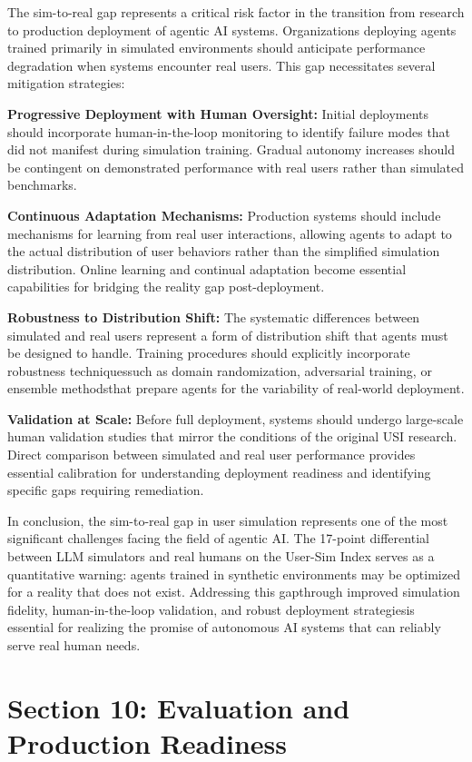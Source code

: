 The sim-to-real gap represents a critical risk factor in the transition from research to production deployment of agentic AI systems. Organizations deploying agents trained primarily in simulated environments should anticipate performance degradation when systems encounter real users. This gap necessitates several mitigation strategies:

\textbf{Progressive Deployment with Human Oversight:} Initial deployments should incorporate human-in-the-loop monitoring to identify failure modes that did not manifest during simulation training. Gradual autonomy increases should be contingent on demonstrated performance with real users rather than simulated benchmarks.

\textbf{Continuous Adaptation Mechanisms:} Production systems should include mechanisms for learning from real user interactions, allowing agents to adapt to the actual distribution of user behaviors rather than the simplified simulation distribution. Online learning and continual adaptation become essential capabilities for bridging the reality gap post-deployment.

\textbf{Robustness to Distribution Shift:} The systematic differences between simulated and real users represent a form of distribution shift that agents must be designed to handle. Training procedures should explicitly incorporate robustness techniquessuch as domain randomization, adversarial training, or ensemble methodsthat prepare agents for the variability of real-world deployment.

\textbf{Validation at Scale:} Before full deployment, systems should undergo large-scale human validation studies that mirror the conditions of the original USI research. Direct comparison between simulated and real user performance provides essential calibration for understanding deployment readiness and identifying specific gaps requiring remediation.

In conclusion, the sim-to-real gap in user simulation represents one of the most significant challenges facing the field of agentic AI. The 17-point differential between LLM simulators and real humans on the User-Sim Index serves as a quantitative warning: agents trained in synthetic environments may be optimized for a reality that does not exist. Addressing this gapthrough improved simulation fidelity, human-in-the-loop validation, and robust deployment strategiesis essential for realizing the promise of autonomous AI systems that can reliably serve real human needs.
\section{Section 10: Evaluation and Production Readiness}

